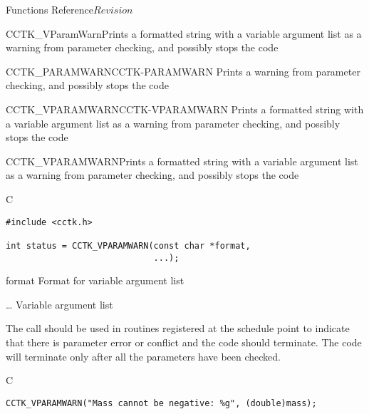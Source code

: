\begin{cactuspart}{ Functions Reference}{}{$Revision$}
\begin{FunctionDescription}{CCTK\_VParamWarn}{Prints a formatted string with a variable argument list as a warning from parameter checking, and possibly stops the code}
\begin{SeeAlsoSection}
\begin{SeeAlso2}{CCTK\_PARAMWARN}{CCTK-PARAMWARN}
Prints a warning from parameter checking, and possibly stops the code
\end{SeeAlso2}
\begin{SeeAlso2}{CCTK\_VPARAMWARN}{CCTK-VPARAMWARN}
Prints a formatted string with a variable argument list as a warning from
parameter checking, and possibly stops the code
\end{SeeAlso2}
\end{SeeAlsoSection}
\end{FunctionDescription}

\begin{FunctionDescription}{CCTK\_VPARAMWARN}{Prints a formatted string with a
variable argument list as a warning from parameter checking, and possibly
stops the code}
\label{CCTK-VPARAMWARN}
\begin{SynopsisSection}
\begin{Synopsis}{C}
\begin{verbatim}
#include <cctk.h>

int status = CCTK_VPARAMWARN(const char *format,
                             ...);
\end{verbatim}
\end{Synopsis}
\end{SynopsisSection}
\begin{ParameterSection}
\begin{Parameter}{format}
Format for variable argument list
\end{Parameter}
\begin{Parameter}{\ldots}
Variable argument list
\end{Parameter}
\end{ParameterSection}
\begin{Discussion}
The call should be used in routines registered at the schedule point 
to indicate that there is parameter error or conflict and the code should
terminate. The code will terminate only after all the parameters have been
checked.
\end{Discussion}
\begin{ExampleSection}
\begin{Example}{C}
\begin{verbatim}
CCTK_VPARAMWARN("Mass cannot be negative: %g", (double)mass);
\end{verbatim}
\end{Example}
\end{ExampleSection}


\end{FunctionDescription}
\end{cactuspart}
